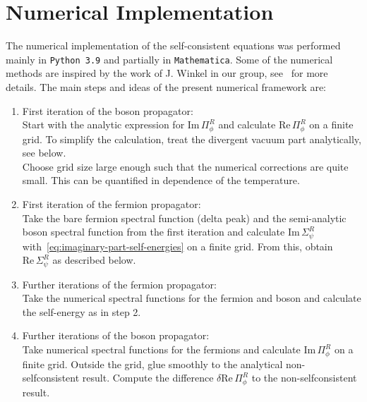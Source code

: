 \chapter{Numerical Implementation}
\label{app:numerical-implementation}

The numerical implementation of the self-consistent equations was performed mainly
in \verb|Python 3.9| and partially in \verb|Mathematica|. Some of the numerical methods are inspired by the work of J. Winkel in our group, see~\cite{Winkel2021} for more details. The main steps and ideas of the present numerical framework are:

\begin{enumerate}
\item First iteration of the boson propagator: \\
Start with the analytic expression for $\text{Im}\,\Pi^R_{\phi}$ and calculate $\text{Re}\,\Pi^R_{\phi}$ on a finite grid. To simplify the calculation, treat the divergent vacuum part analytically, see below. \\
Choose grid size large enough such that the numerical corrections are quite small. This can be quantified in dependence of the temperature.
\item First iteration of the fermion propagator: \\
Take the bare fermion spectral function (delta peak) and the semi-analytic boson spectral function from the first iteration and calculate $\text{Im}\,\Sigma^R_{\psi}$ with~\eqref{eq:imaginary-part-self-energies} on a finite grid. From this, obtain $\text{Re}\,\Sigma^R_{\psi}$ as described below.
\item Further iterations of the fermion propagator: \\
Take the numerical spectral functions for the fermion and boson and calculate the self-energy as in step 2.
\item Further iterations of the boson propagator: \\
Take numerical spectral functions for the fermions and calculate $\text{Im}\,\Pi^R_{\phi}$ on a finite grid. Outside the grid, glue smoothly to the analytical non-selfconsistent result. Compute the difference $\delta\text{Re}\,\Pi^R_{\phi}$ to the non-selfconsistent result.
\end{enumerate}

